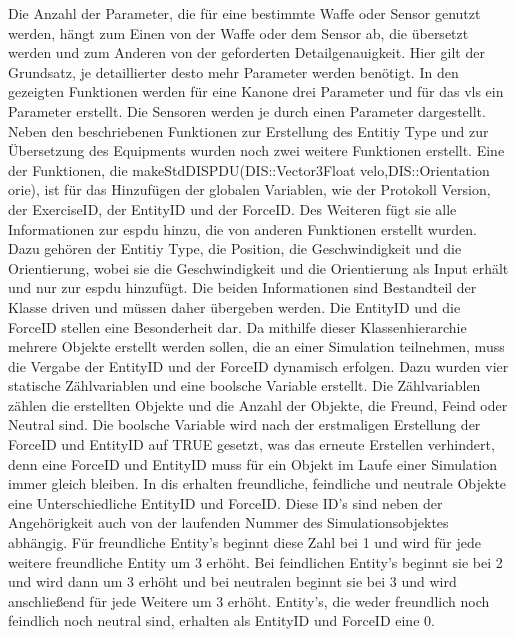 Die Anzahl der Parameter, die für eine bestimmte Waffe oder Sensor genutzt werden, hängt zum Einen von der Waffe oder dem Sensor ab, die übersetzt werden und zum Anderen von der geforderten Detailgenauigkeit. Hier gilt der Grundsatz, je detaillierter desto mehr Parameter werden benötigt. In den gezeigten Funktionen werden für eine Kanone drei Parameter und für das \ac{vls} ein Parameter  erstellt. Die Sensoren werden je durch einen Parameter dargestellt.\\ 
Neben den beschriebenen Funktionen zur Erstellung des \glqq Entitiy Type\grqq{} und zur Übersetzung des Equipments wurden noch zwei weitere Funktionen erstellt. Eine der Funktionen, die  \glqq makeStdDISPDU(DIS::Vector3Float velo,DIS::Orientation orie)\grqq{}, ist für das Hinzufügen der globalen Variablen, wie der Protokoll Version, der ExerciseID, der EntityID und der ForceID. Des Weiteren fügt sie alle Informationen zur \ac{espdu} hinzu, die von anderen Funktionen erstellt wurden. Dazu gehören der \glqq Entitiy Type\grqq{}, die Position, die Geschwindigkeit und die Orientierung, wobei sie die Geschwindigkeit und die  Orientierung als Input erhält und nur zur \ac{espdu} hinzufügt. Die beiden Informationen sind Bestandteil der Klasse \glqq driven\grqq{} und müssen daher übergeben werden. Die EntityID und die ForceID stellen eine Besonderheit dar. Da mithilfe dieser Klassenhierarchie mehrere Objekte erstellt werden sollen, die an einer Simulation teilnehmen, muss die Vergabe der EntityID und der ForceID dynamisch erfolgen.  
Dazu wurden vier statische Zählvariablen und eine boolsche Variable erstellt. Die Zählvariablen zählen die erstellten Objekte und die Anzahl der Objekte, die Freund, Feind oder Neutral sind. Die boolsche Variable wird nach der erstmaligen Erstellung der ForceID und EntityID auf \glqq TRUE\grqq{} gesetzt, was das erneute Erstellen verhindert, denn eine ForceID und EntityID  muss für ein Objekt im Laufe einer Simulation immer gleich bleiben. In \ac{dis} erhalten freundliche, feindliche und neutrale Objekte eine Unterschiedliche EntityID und ForceID. Diese ID's sind neben der Angehörigkeit auch von der laufenden Nummer des Simulationsobjektes abhängig. Für freundliche Entity's beginnt diese Zahl bei 1 und wird für jede weitere freundliche Entity um 3 erhöht. Bei feindlichen Entity's beginnt sie bei 2 und wird dann um 3 erhöht und bei neutralen beginnt sie bei 3 und wird anschließend für jede Weitere um 3 erhöht. Entity's, die weder freundlich noch feindlich noch neutral sind, erhalten als EntityID und ForceID eine 0. 
